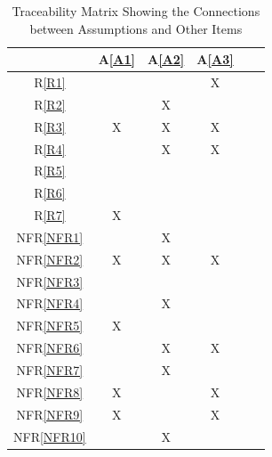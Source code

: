\documentclass[12pt]{article}
\newcommand{\aref}[1]{A\ref{#1}}
\newcommand{\frref}[1]{R\ref{#1}}
\newcommand{\nfrref}[1]{NFR\ref{#1}}
\begin{document}
\noindent

\begin{table}[H]
	\caption{Traceability Matrix Showing the Connections between Assumptions and Other Items}
	\centering
	\begin{tabular}{|c|c|c|c|c|c}
	\hline
		& \aref{A1}& \aref{A2}& \aref{A3} \\
	\hline          %
	\frref{R1}       &   &   & X  \\ \hline
	\frref{R2}       &   & X&    \\ \hline
	\frref{R3}       & X& X& X  \\ \hline
	\frref{R4}       &   & X& X  \\ \hline
	\frref{R5}       &   &   &    \\ \hline
	\frref{R6}       &   &   &    \\ \hline
	\frref{R7}       & X&   &     \\ \hline
	\nfrref{NFR1} &   & X&    \\ \hline
	\nfrref{NFR2} & X& X& X \\ \hline
	\nfrref{NFR3} &   &   &     \\ \hline
	\nfrref{NFR4} &   & X&     \\ \hline
	\nfrref{NFR5} &   X&   &      \\ \hline
	\nfrref{NFR6} &   &  X &X     \\ \hline
	\nfrref{NFR7} &   &  X &     \\ \hline
	\nfrref{NFR8} &  X &   &X     \\ \hline
	\nfrref{NFR9} & X  &   &X      \\ \hline
	\nfrref{NFR10}&  & X  &      \\
	\hline
	\end{tabular}

	\label{Table:A_trace}
\end{table}
\end{document}

